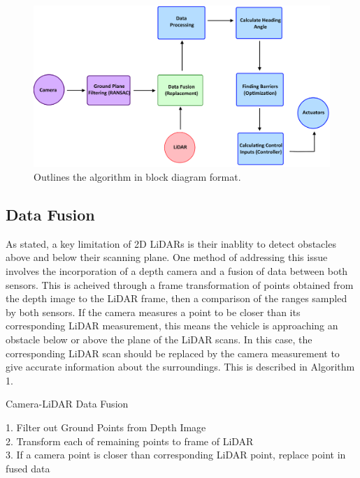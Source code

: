 \documentclass[conference]{IEEEtran}
\begin{document}
\begin{figure}
    \centering
    \includegraphics[scale=0.13]{algorithm.png}
    \caption{Outlines the algorithm in block diagram format. }
    \label{Figure 4}
\end{figure}



\subsection{Data Fusion}
As stated, a key limitation of 2D LiDARs is their inablity to detect obstacles above and below their scanning plane. One method of addressing this issue involves the incorporation of a depth camera and a fusion of data between both sensors. This is acheived through a frame transformation of points obtained from the depth image to the LiDAR frame, then a comparison of the ranges sampled by both sensors. If the camera measures a point to be closer than its corresponding LiDAR measurement, this means the vehicle is approaching an obstacle below or above the plane of the LiDAR scans. In this case, the corresponding LiDAR scan should be replaced by the camera measurement to give accurate information about the surroundings. This is described in Algorithm 1.

\begin{algorithm}
\caption{Camera-LiDAR Data Fusion}

        1. Filter out Ground Points from Depth Image\\
        2. Transform each of remaining points to frame of LiDAR\\
        3. If a camera point is closer than corresponding LiDAR point,   replace point in fused data \\

\end{algorithm}
\end{document}
